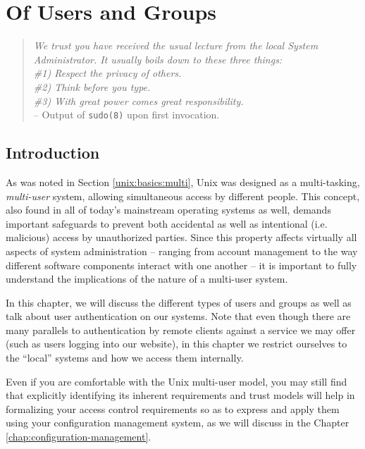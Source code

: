 \chapter{Of Users and Groups}
\label{chap:multi-user}

\begin{quote}

{\em We trust you have received the usual lecture from
the local System Administrator. It usually boils down
to these three things:\\
\#1) Respect the privacy of others.\\
\#2) Think before you type.\\
\#3) With great power comes great responsibility.} \\
-- Output of {\tt sudo(8)} upon first invocation.
\end{quote}


\section{Introduction}
\label{multi-user:introduction}

As was noted in Section \ref{unix:basics:multi}, Unix
was designed as a multi-tasking, {\em multi-user}
system, allowing simultaneous access by different
people.  This concept, also found in all of today's
mainstream operating systems as well, demands
important safeguards to prevent both accidental as
well as intentional (i.e. malicious) access by
unauthorized parties.  Since this property affects
virtually all aspects of system administration --
ranging from account management to the way different
software components interact with one another -- it is
important to fully understand the implications of the
nature of a multi-user system.

In this chapter, we will discuss the different types
of users and groups as well as talk about user
authentication on our systems.  Note that even though
there are many parallels to authentication by remote
clients against a service we may offer (such as users
logging into our website), in this chapter we restrict
ourselves to the ``local'' systems and how we access
them internally.

Even if you are comfortable with the Unix multi-user
model, you may still find that explicitly identifying
its inherent requirements and trust models will help
in formalizing your access control requirements so
as to express and apply them using your configuration
management system, as
we will discuss in the Chapter
\ref{chap:configuration-management}.

